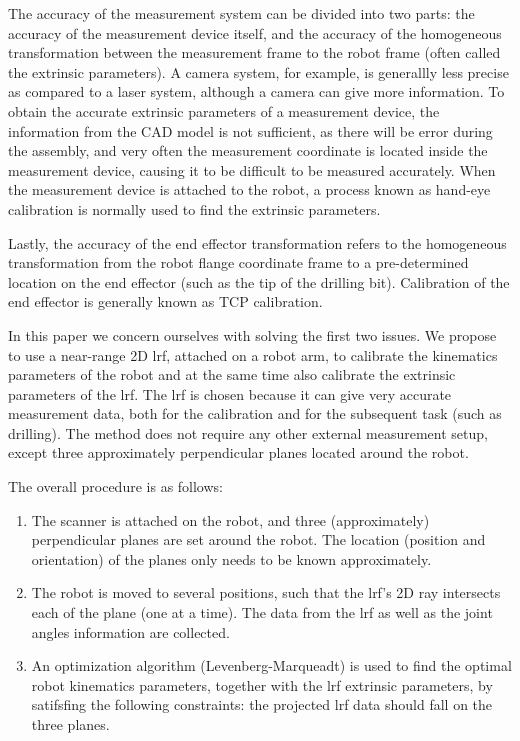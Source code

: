 The accuracy of the measurement system can be divided into two parts: the accuracy of the measurement device itself, and the accuracy of the homogeneous transformation between the measurement frame to the robot frame (often called the extrinsic parameters). A camera system, for example, is generallly less precise as compared to a laser system, although a camera can give more information. To obtain the accurate extrinsic parameters of a measurement device, the information from the CAD model is not sufficient, as there will be error during the assembly, and very often the measurement coordinate is located inside the measurement device, causing it to be difficult to be measured accurately. When the measurement device is attached to the robot, a process known as hand-eye calibration is normally used to find the extrinsic parameters. 

Lastly, the accuracy of the end effector transformation refers to the homogeneous transformation from the robot flange coordinate frame to a pre-determined location on the end effector (such as the tip of the drilling bit). Calibration of the end effector is generally known as TCP calibration. 

In this paper we concern ourselves with solving the first two issues. We propose to use a near-range 2D \ac{lrf}, attached on a robot arm, to calibrate the kinematics parameters of the robot and at the same time also calibrate the extrinsic parameters of the \ac{lrf}. The \ac{lrf} is chosen because it can give very accurate measurement data, both for the calibration and for the subsequent task (such as drilling). The method does not require any other external measurement setup, except three approximately perpendicular planes located around the robot.

The overall procedure is as follows:
\begin{enumerate}
\item The scanner is attached on the robot, and three (approximately) perpendicular planes are set around the robot. The location (position and orientation) of the planes only needs to be known approximately.
\item The robot is moved to several positions, such that the \ac{lrf}'s 2D ray intersects each of the plane (one at a time). The data from the \ac{lrf} as well as the joint angles information are collected.
\item An optimization algorithm (Levenberg-Marqueadt) is used to find the optimal robot kinematics parameters, together with the \ac{lrf} extrinsic parameters, by satifsfing the following constraints: the projected \ac{lrf} data should fall on the three planes. 
\end{enumerate}

